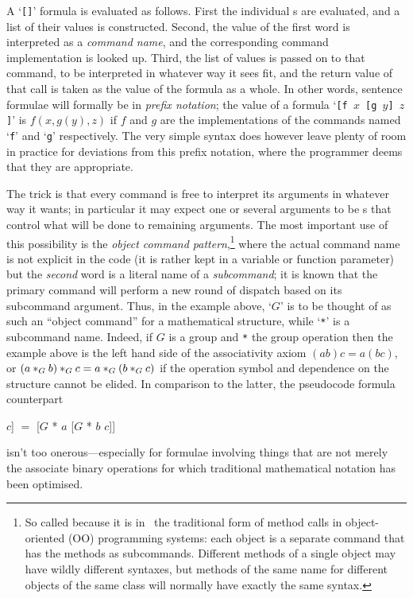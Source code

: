\documentclass{mtmtcl}
\theoremstyle{plain}
\theoremstyle{remark}
\begin{document}
A `\texttt{[}\texttt{]}' formula is evaluated as 
follows. First the individual s are evaluated, and a list 
of their values is constructed. Second, the value of the first word 
is interpreted as a \emph{command name}, and the corresponding 
command implementation is looked up. Third, the list of values is 
passed on to that command, to be interpreted in whatever way it sees 
fit, and the return value of that call is taken as the value of the 
formula as a whole. In other words, sentence formulae will formally 
be in \emph{prefix notation}; the value of a formula `\texttt{[f $x$ 
[g $y$] $z$]}' is $f(x,g(y),z)$ if $f$ and $g$ are the implementations 
of the commands named `\texttt{f}' and `\texttt{g}' respectively. 
The very simple syntax does however leave plenty of room in practice 
for deviations from this prefix notation, where the programmer deems 
that they are appropriate.

The trick is that every command is free to interpret its arguments in 
whatever way it wants; in particular it may expect one or several 
arguments to be s that control what will be done to 
remaining arguments. The most important use of this 
possibility is the \emph{object command pattern},\footnote{
  So called because it is in \Tcl\ the traditional form of method 
  calls in object-oriented (OO) programming systems: each object is 
  a separate command that has the methods as subcommands. Different 
  methods of a single object may have wildly different syntaxes, but 
  methods of the same name for different objects of the same class 
  will normally have exactly the same syntax.
} where the actual 
command name is not explicit in the code (it is rather kept in a 
variable or function parameter) but the \emph{second} word is a 
literal name of a \emph{subcommand}; it is known that the primary 
command will perform a new round of dispatch based on its subcommand 
argument. Thus, in the example above, `$G$' is to be thought of as 
such an ``object command'' for a mathematical structure, while 
`\texttt{*}' is a subcommand name. Indeed, if $G$ is a group and 
\texttt{*} the group operation then the example above is the left 
hand side of the associativity axiom \((ab)c = a(bc)\), or \((a 
*_G\nobreak b) *_G c = a *_G (b *_G\nobreak c)\) if the operation 
symbol and dependence on the structure cannot be elided. In 
comparison to the latter, the pseudocode formula counterpart
\begin{displaysyntax}
  [$G$ * [$G$ * $a$ $b$] $c$] ${}={}$ [$G$ * $a$ [$G$ * $b$ $c$]]
\end{displaysyntax}
isn't too onerous---especially for formulae involving things that are 
not merely the associate binary operations for which traditional 
mathematical notation has been optimised.
\end{document}
